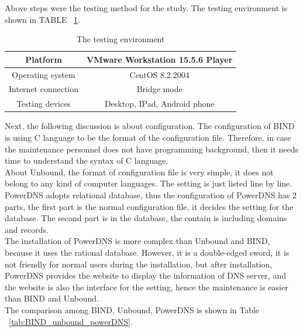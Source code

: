\documentclass[conference]{IEEEtran}
\begin{document}
Above steps were the testing method for the study. The testing environment is shown in TABLE ~\ref{tab:Testing_environment}.

\begin{table}[hbt!]
    \centering
    \begin{tabular}{|c|c|}
        \hline
         Platform & VMware Workstation 15.5.6 Player \\    
        \hline
         Operating system & CentOS 8.2.2004 \\
        \hline
         Internet connection & Bridge mode \\
        \hline
         Testing devices & Desktop, IPad, Android phone\\
        \hline
    \end{tabular}
    \caption{The testing environment}
    \label{tab:Testing_environment}
\end{table}

Next, the following discussion is about configuration. The configuration of BIND is using C language to be the format of the configuration file. Therefore, in case the maintenance personnel does not have programming background, then it needs time to understand the syntax of C language.
\\

About Unbound, the format of configuration file is very simple, it does not belong to any kind of computer languages. The setting is just listed line by line.
\\

PowerDNS adopts relational database, thus the configuration of PowerDNS has 2 parts, the first part is the normal configuration file, it decides the setting for the database. The second part is in the database, the contain is including domains and records.
\\

The installation of PowerDNS is more complex than Unbound and BIND, because it uses the rational database. However, it is a double-edged sword, it is not friendly for normal users during the installation, but after installation, PowerDNS provides the website to display the information of DNS server, and the website is also the interface for the setting, hence the maintenance is easier than BIND and Unbound.
\\

The comparison among BIND, Unbound, PowerDNS is shown in Table ~\ref{tab:BIND_unbound_powerDNS}.
\end{document}
